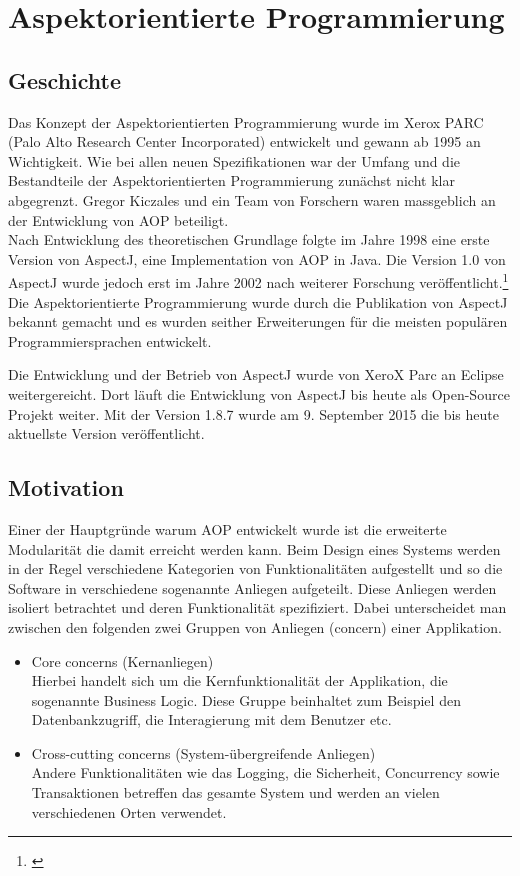 \chapter{Aspektorientierte Programmierung}
\label{chap:aop}

\section{Geschichte}
\label{sec:aop_geschichte}

Das Konzept der Aspektorientierten Programmierung wurde im Xerox PARC (Palo Alto Research Center Incorporated) entwickelt und gewann ab 1995 an Wichtigkeit. Wie bei allen neuen Spezifikationen war der Umfang und die Bestandteile der Aspektorientierten Programmierung zunächst nicht klar abgegrenzt. Gregor Kiczales und ein Team von Forschern waren massgeblich an der Entwicklung von AOP beteiligt.\\
Nach Entwicklung des theoretischen Grundlage folgte im Jahre 1998 eine erste Version von AspectJ, eine Implementation von AOP in Java. Die Version 1.0 von AspectJ wurde jedoch erst im Jahre 2002 nach weiterer Forschung veröffentlicht.\footnote{\cite{lopes:historyaop}} \\
Die Aspektorientierte Programmierung wurde durch die Publikation von AspectJ bekannt gemacht und es wurden seither Erweiterungen für die meisten populären Programmiersprachen entwickelt. 

Die Entwicklung und der Betrieb von AspectJ wurde von XeroX Parc an Eclipse weitergereicht. Dort läuft die Entwicklung von AspectJ bis heute als Open-Source Projekt weiter. Mit der Version 1.8.7 wurde am 9. September 2015 die bis heute aktuellste Version veröffentlicht.

\section{Motivation}
\label{sec:aop_motivation}

Einer der Hauptgründe warum AOP entwickelt wurde ist die erweiterte Modularität die damit erreicht werden kann. Beim Design eines Systems werden in der Regel verschiedene Kategorien von Funktionalitäten aufgestellt und so die Software in verschiedene sogenannte Anliegen aufgeteilt. Diese Anliegen werden isoliert betrachtet und deren Funktionalität spezifiziert. Dabei unterscheidet man zwischen den folgenden zwei Gruppen von Anliegen (concern) einer Applikation.

\begin{itemize}
	\item Core concerns (Kernanliegen)\\
	Hierbei handelt sich um die Kernfunktionalität der Applikation, die sogenannte Business Logic. Diese Gruppe beinhaltet zum Beispiel den Datenbankzugriff, die Interagierung mit dem Benutzer etc.
	\item Cross-cutting concerns (System-übergreifende Anliegen) \\
	Andere Funktionalitäten wie das Logging, die Sicherheit, Concurrency sowie Transaktionen betreffen das gesamte System und werden an vielen verschiedenen Orten verwendet.
\end{itemize}


